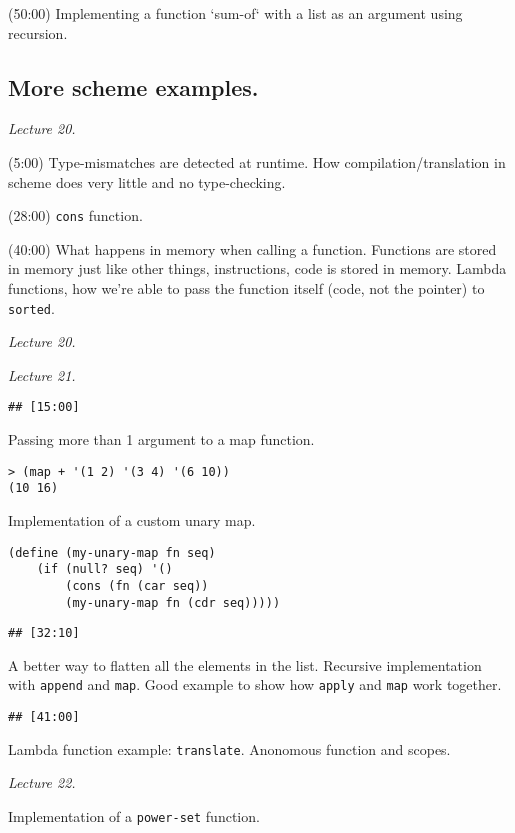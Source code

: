 (50:00) Implementing a function `sum-of` with a list as an
argument using recursion.

\subsection{More scheme examples.}%
\textit{Lecture 20.}

(5:00) Type-mismatches are detected at runtime. How
compilation/translation in scheme does very little and no
type-checking.

(28:00) \verb!cons! function.

(40:00) What happens in memory when calling a function. Functions
are stored in memory just like other things, instructions, code
is stored in memory. Lambda functions, how we're able to pass the
function itself (code, not the pointer) to \verb!sorted!.

\textit{Lecture 20.}

\textit{Lecture 21.}

\verb!## [15:00]!

Passing more than 1 argument to a map function.
\begin{verbatim}
> (map + '(1 2) '(3 4) '(6 10))
(10 16)
\end{verbatim}
Implementation of a custom unary map.
\begin{verbatim}
(define (my-unary-map fn seq)
    (if (null? seq) '()
        (cons (fn (car seq))
        (my-unary-map fn (cdr seq)))))
\end{verbatim}

\verb!## [32:10]!

A better way to flatten all the elements in the list.
Recursive implementation with \verb!append! and
\verb!map!. Good example to show how \verb!apply! and
\verb!map! work together.

\verb!## [41:00]!

Lambda function example: \verb!translate!. Anonomous function and
    scopes.

\textit{Lecture 22.}

Implementation of a \verb!power-set! function.


